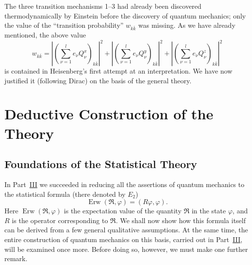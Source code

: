 \documentclass[fontsize=13pt,twoside,openany,headings=normal,parskip=false,bookmarkpackage=false,DIV=calc]{scrbook}
\begin{document}
The three transition mechanisms 1--3 had already been discovered thermodynamically by Einstein before the discovery of quantum \hypertarget{origpage-157}{}mechanics; only the value of the ``transition probability'' $w_{k\bar k}$ was missing. As we have already mentioned, the above value
\[
 w_{k\bar k}=\left|\left(\sum_{\nu=1}^{l}e_\nu Q_\nu^x\right)_{k\bar k}\right|^2
 +\left|\left(\sum_{\nu=1}^{l}e_\nu Q_\nu^y\right)_{k\bar k}\right|^2
 +\left|\left(\sum_{\nu=1}^{l}e_\nu Q_\nu^z\right)_{k\bar k}\right|^2
\]\nopagebreak[4]
is contained in Heisenberg's first attempt at an interpretation. We have now justified it (following Dirac) on the basis of the general theory.


\chapter{Deductive Construction of the Theory}\label{chap:IV}
\section{Foundations of the Statistical Theory}\label{sec:IV.1}

In Part~\hyperref[chap:III]{III} we succeeded in reducing all the assertions of quantum mechanics to the statistical formula (there denoted by \hyperref[post:III.1.E2]{$E_2$})
\begin{equation}\tag{$\overline E$}\label{eq:IV.1.E}
\operatorname{Erw}(\mathfrak R,\varphi)=(R\varphi,\varphi).
\end{equation}
Here $\operatorname{Erw}(\mathfrak R,\varphi)$ is the expectation value of the quantity $\mathfrak R$ in the state $\varphi$, and $R$ is the operator corresponding to $\mathfrak R$. We shall now show how this formula itself can be derived from a few general qualitative assumptions. At the same time, the entire construction of quantum mechanics on this basis, carried out in Part~\hyperref[chap:III]{III}, will be examined once more. Before doing so, however, we must make one further remark.
\end{document}
